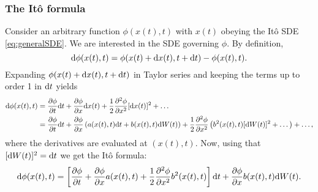 \subsubsection{The Itô formula}
Consider an arbitrary function $\phi(x(t),t)$ with $x(t)$ obeying the Itô SDE \eqref{eq:generalSDE}. We are interested in the SDE governing $\phi$. By definition, 
\begin{equation}
	\rm d\phi(x(t),t) = \phi(x(t)+\rm dx(t),t+ \rm dt) - \phi(x(t),t). 	
\end{equation}
Expanding $\phi(x(t)+\rm dx(t),t+ \rm dt)$ in Taylor series and keeping the terms up to order 1 in $\rm dt$ yields
\begin{align}
\rm d\phi(x(t),t) &= \frac{\partial \phi}{\partial t}\rm dt + \frac{\partial \phi}{\partial x}\rm dx(t) + \frac{1}{2} \frac{\partial^2 \phi}{\partial x^2} [\rm dx(t)]^2 + \dots \nonumber\\
&= \frac{\partial \phi}{\partial t}\rm dt + \frac{\partial \phi}{\partial x}\left(a(x(t),t) \rm dt + b(x(t),t) \rm dW(t)\right) + \frac{1}{2} \frac{\partial^2 \phi}{\partial x^2} \left(b^2(x(t),t) [\rm dW(t)]^2 + \dots \right) + \dots, \nonumber
\end{align}
where the derivatives are evaluated at $(x(t),t)$. Now, using that $[\rm dW(t)]^2 = \rm dt$ we get the Itô formula:
\begin{equation} \label{eq:ItoFormula}
	\rm d\phi(x(t),t) = \left[\frac{\partial \phi}{\partial t} + \frac{\partial \phi}{\partial x} a(x(t),t) + \frac{1}{2}\frac{\partial^2 \phi}{\partial x^2} b^2(x(t),t)\right] \rm dt + \frac{\partial \phi}{\partial x}b(x(t),t) \rm dW(t).
\end{equation}

